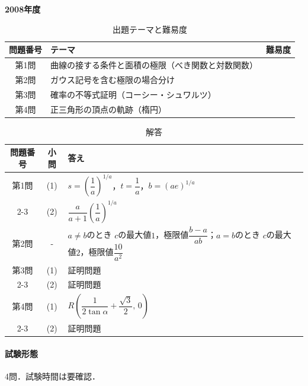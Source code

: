 \documentclass[../../main.tex]{subfiles}
\begin{document}
\begin{center}
  {\fontsize{48pt}{58pt}\selectfont \textbf{2008}\normalsize\textbf{年度}}
\end{center}

\begin{table}[htb]
  \centering
  \caption{出題テーマと難易度}
  \begin{tabular}{|c|p{9cm}|c|}
    \hline
    \textbf{問題番号} & \textbf{テーマ} & \textbf{難易度} \\
    \hline
    第1問 & 曲線の接する条件と面積の極限（べき関数と対数関数） & \\
    \hline
    第2問 & ガウス記号を含む極限の場合分け & \\
    \hline
    第3問 & 確率の不等式証明（コーシー・シュワルツ） & \\
    \hline
    第4問 & 正三角形の頂点の軌跡（楕円） & \\
    \hline
  \end{tabular}
\end{table}

\begin{table}[htb]
  \centering
  \caption{解答}
  \renewcommand{\arraystretch}{1.4}
  \begin{tabular}{|c|c|p{9cm}|}
    \hline
    \textbf{問題番号} & \textbf{小問} & \textbf{答え} \\
    \hline
    第1問 & (1) & $s=\left(\dfrac{1}{a}\right)^{1/a}$，$t=\dfrac{1}{a}$，$b=(ae)^{1/a}$ \\
    \cline{2-3}
    & (2) & $\dfrac{a}{a+1}\left(\dfrac{1}{a}\right)^{1/a}$ \\
    \hline
    第2問 & - & $a\neq b$のとき $c$の最大値$1$，極限値$\dfrac{b-a}{ab}$；$a=b$のとき $c$の最大値$2$，極限値$\dfrac{10}{a^2}$ \\
    \hline
    第3問 & (1) & 証明問題 \\
    \cline{2-3}
    & (2) & 証明問題 \\
    \hline
    第4問 & (1) & $R\left(\dfrac{1}{2\tan\alpha}+\dfrac{\sqrt{3}}{2},\,0\right)$ \\
    \cline{2-3}
    & (2) & 証明問題 \\
    \hline
  \end{tabular}
\end{table}

\paragraph{試験形態}
4問．試験時間は要確認．
\end{document}
